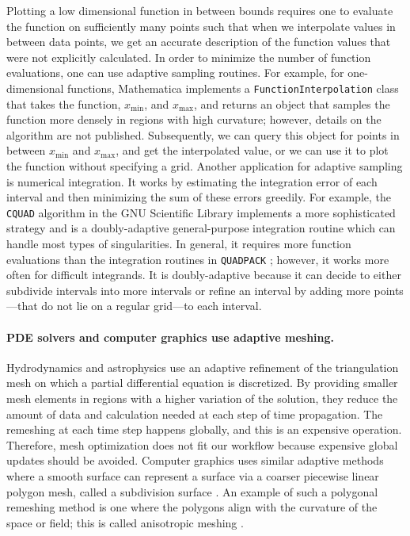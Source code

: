 \documentclass[english, twocolumn, 10pt, aps, superscriptaddress, floatfix, prb, citeautoscript]{revtex4-1}
\renewcommand{\citep}{\cite}
\newcommand{\passthrough}[1]{\lstset{mathescape=false}#1\lstset{mathescape=true}}
\begin{document}
Plotting a low dimensional function in between bounds requires one to evaluate the function on sufficiently many points such that when we interpolate values in between data points, we get an accurate description of the function values that were not explicitly calculated.
In order to minimize the number of function evaluations, one can use adaptive sampling routines.
For example, for one-dimensional functions, Mathematica \citep{WolframResearch} implements a \passthrough{\lstinline!FunctionInterpolation!} class that takes the function, \(x_\textrm{min}\), and \(x_\textrm{max}\), and returns an object that samples the function more densely in regions with high curvature; however, details on the algorithm are not published.
Subsequently, we can query this object for points in between \(x_\textrm{min}\) and \(x_\textrm{max}\), and get the interpolated value, or we can use it to plot the function without specifying a grid.
Another application for adaptive sampling is numerical integration.
It works by estimating the integration error of each interval and then minimizing the sum of these errors greedily.
For example, the \passthrough{\lstinline!CQUAD!} algorithm \citep{Gonnet2010} in the GNU Scientific Library \citep{Galassi1996} implements a more sophisticated strategy and is a doubly-adaptive general-purpose integration routine which can handle most types of singularities.
In general, it requires more function evaluations than the integration routines in \passthrough{\lstinline!QUADPACK!} \citep{Galassi1996}; however, it works more often for difficult integrands.
It is doubly-adaptive because it can decide to either subdivide intervals into more intervals or refine an interval by adding more points---that do not lie on a regular grid---to each interval.

\hypertarget{pde-solvers-and-computer-graphics-use-adaptive-meshing.}{%
\paragraph{PDE solvers and computer graphics use adaptive meshing.}\label{pde-solvers-and-computer-graphics-use-adaptive-meshing.}}

Hydrodynamics \citep{Berger1989, Berger1984} and astrophysics \citep{Klein1999} use an adaptive refinement of the triangulation mesh on which a partial differential equation is discretized.
By providing smaller mesh elements in regions with a higher variation of the solution, they reduce the amount of data and calculation needed at each step of time propagation.
The remeshing at each time step happens globally, and this is an expensive operation.
Therefore, mesh optimization does not fit our workflow because expensive global updates should be avoided.
Computer graphics uses similar adaptive methods where a smooth surface can represent a surface via a coarser piecewise linear polygon mesh, called a subdivision surface \citep{DeRose1998}.
An example of such a polygonal remeshing method is one where the polygons align with the curvature of the space or field; this is called anisotropic meshing \citep{Alliez2003}.
\end{document}
